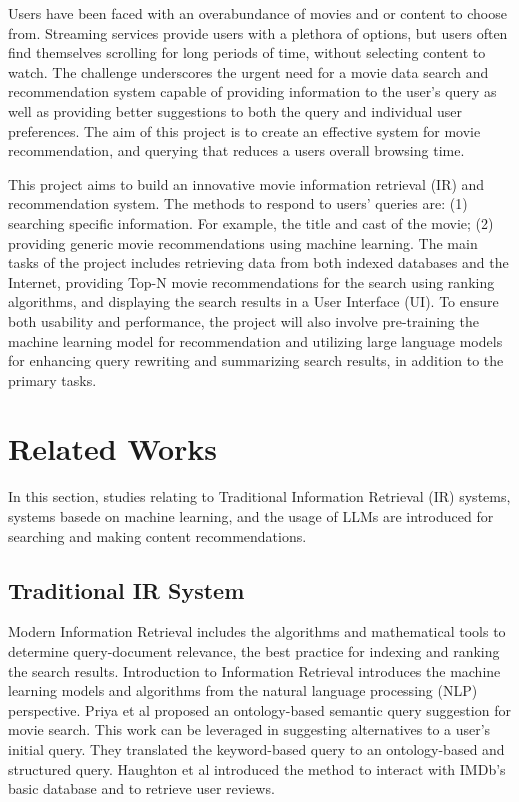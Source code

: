 \documentclass[journal]{IEEEtran}
\begin{document}
Users have been faced with an overabundance of movies and or content to choose from. Streaming services provide users with a plethora of options, but users often find themselves scrolling for long periods of time, without selecting content to watch. The challenge underscores the urgent need for a movie data search and recommendation system capable of providing information to the user’s query as well as providing better suggestions to both the query and individual user preferences. The aim of this project is to create an effective system for movie recommendation, and querying that reduces a users overall browsing time.

This project aims to build an innovative movie information retrieval (IR) and recommendation system. The methods to respond to users’ queries are: (1) searching specific information. For example, the title and cast of the movie; (2) providing generic movie recommendations using machine learning. The main tasks of the project includes retrieving data from both indexed databases and the Internet, providing Top-N movie recommendations for the search using ranking algorithms, and displaying the search results in a User Interface (UI). To ensure both usability and performance, the project will also involve pre-training the machine learning model for recommendation and utilizing large language models for enhancing query rewriting and summarizing search results, in addition to the primary tasks. 

\section{Related Works}
In this section, studies relating to Traditional Information Retrieval (IR) systems, systems basede on machine learning, and the usage of LLMs are introduced for searching and making content recommendations.

\subsection{Traditional IR System}
Modern Information Retrieval\cite{RN15} includes the algorithms and mathematical tools to determine query-document relevance, the best practice for indexing and ranking the search results. Introduction to Information Retrieval\cite{manning2008introduction} introduces the machine learning models and algorithms from the natural language processing (NLP) perspective. Priya et al\cite{6508326} proposed an ontology-based semantic query suggestion for movie search. This work can be leveraged in suggesting alternatives to a user’s initial query. They translated the keyword-based query to an ontology-based and structured query. Haughton et al\cite{RN16} introduced the method to interact with IMDb’s basic database and to retrieve user reviews. 
\end{document}
